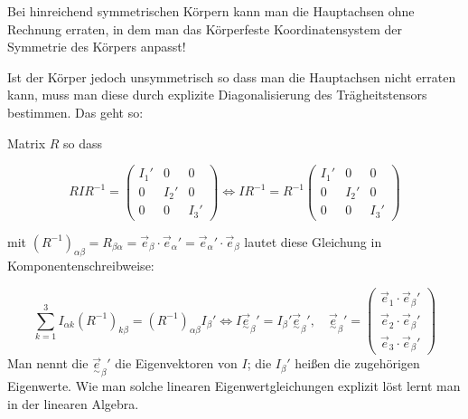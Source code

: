 \documentclass[10pt, letterpaper]{article}
\begin{document}
Bei hinreichend symmetrischen Körpern kann man die Hauptachsen ohne Rechnung erraten, in dem man das Körperfeste Koordinatensystem der Symmetrie des Körpers anpasst!

Ist der Körper jedoch unsymmetrisch so dass man die Hauptachsen nicht erraten kann, muss man diese durch explizite Diagonalisierung des Trägheitstensors bestimmen. Das geht so:

Matrix $R$ so dass

\[
RIR^{-1} = \begin{pmatrix}
I_1' & 0 & 0 \\
0 & I_2' & 0 \\
0 & 0 & I_3'
\end{pmatrix} \Leftrightarrow IR^{-1} = R^{-1} \begin{pmatrix}
I_1' & 0 & 0 \\
0 & I_2' & 0 \\
0 & 0 & I_3'
\end{pmatrix}
\]

mit $(R^{-1})_{\alpha\beta} = R_{\beta\alpha} = \vec{e}_\beta \cdot \vec{e}_\alpha' = \vec{e}_\alpha' \cdot \vec{e}_\beta$ lautet diese Gleichung in Komponentenschreibweise:

\[
\sum_{k=1}^3 I_{\alpha k}(R^{-1})_{k\beta} = (R^{-1})_{\alpha\beta}I_\beta' \Leftrightarrow I\vec{\underset{\sim}{e}}_\beta' = I_\beta'\vec{\underset{\sim}{e}}_\beta', \quad \vec{\underset{\sim}{e}}_\beta' = \begin{pmatrix}
\vec{e}_1 \cdot \vec{e}_\beta' \\
\vec{e}_2 \cdot \vec{e}_\beta' \\
\vec{e}_3 \cdot \vec{e}_\beta'
\end{pmatrix}
\]
Man nennt die $\vec{\underset{\sim}{e}}_\beta'$ die Eigenvektoren von $I$; die $I_\beta'$ heißen die zugehörigen Eigenwerte. Wie man solche linearen Eigenwertgleichungen explizit löst lernt man in der linearen Algebra.
\end{document}
